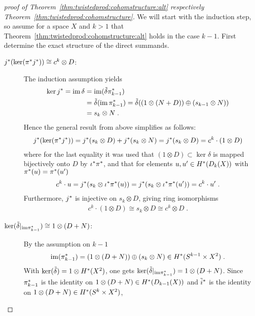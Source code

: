 \begin{proof}[proof of
  Theorem~\ref{thm:twistedprod:cohomstructure:alt}
  respectively Theorem~\ref{thm:twistedprod:cohomstructure}]
  We will start with the induction step, so assume for a space $X$ and
  $k>1$ that Theorem~\ref{thm:twistedprod:cohomstructure:alt} holds in
  the case $k-1$.
  First determine the exact structure of the direct summands.
  \begin{description}
  \item[${j}^*(\ker({\pi}^*{j}^*))\cong c^k\otimes D$:]
    The induction assumption yields
    \begin{align*}
      \ker{j}^*
      = \operatorname{im}\delta
      &= \operatorname{im}(\tilde\delta{\pi}^*_{k-1}) \\
      &= \tilde\delta(\operatorname{im}{\pi}^*_{k-1})
        = \tilde\delta((1\otimes(N+D)) \oplus (s_{k-1}\otimes N)) \\
      &= s_k\otimes N
        \;.
    \end{align*}
    Hence the general result from above simplifies as follows: 
    \begin{gather*}
      {j}^*(\ker({\pi}^*{j}^*))
      = {j}^*(s_k\otimes D) + {j}^*(s_k\otimes N)
      = {j}^*(s_k\otimes D)
      = c^k\cdot (1\otimes D)
    \end{gather*}
    where for the last equality it was used that
    $(1\otimes D)\subset\ker\delta$ is mapped bijectively onto $D$ by
    ${\iota}^*{\pi}^*$, and that for elements
    $u,u'\in H^*(D_{k}({X}))$ with ${\pi}^*(u)={\pi}^*(u')$
    \begin{gather*}
      c^k\cdot u
      ={j}^*(s_k\otimes{\iota}^*{\pi}^*(u))
      ={j}^*(s_k\otimes{\iota}^*{\pi}^*(u'))
      =c^k\cdot u'
      \;.
    \end{gather*}
    Furthermore, ${j}^*$ is injective on $s_k\otimes D$, giving
    ring isomorphisms
    \begin{gather*}
      c^k\cdot (1\otimes D)\cong s_k\otimes D\cong c^k\otimes D
      \;.
    \end{gather*}
  \item[$\ker(\tilde\delta|_{\mathrm{im}{\pi}^*_{k-1}})\cong 1\otimes (D+N)$:]
    By the assumption on $k-1$
    \begin{gather*}
      \mathrm{im}({\pi}^*_{k-1})
      =(1\otimes(D+N))\oplus (s_k\otimes N)
      \in H^*(S^{k-1}\times X^2)
      \;.
    \end{gather*}
    With $\ker(\tilde\delta) = 1\otimes H^*(X^2)$, one gets
    $\ker(\tilde\delta|_{\mathrm{im}{\pi}^*_{k-1}}) = 1\otimes (D+N)$.
    Since ${\pi}^*_{k-1}$ is the identity on
    $1\otimes(D+N)\in H^*(D_{k-1}({X}))$ and ${\tilde i}^*$ is
    the identity on $1\otimes(D+N)\in H^*(S^{k}\times X^2)$,

\end{description}
\end{proof}
